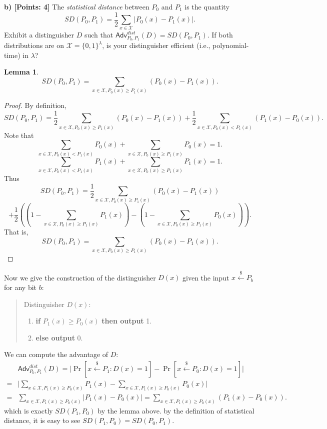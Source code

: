 \documentclass[12pt]{article}
\newcommand{\bits}{\{0,1\}}
\newcommand{\getsr}{\stackrel{\$}{\gets}}
\newcommand{\Adv}{\textsf{Adv}}
\newtheorem{lemma}[theorem]{Lemma}
\theoremstyle{definition}
\begin{document}
{\bf b) [Points: 4]} The \emph{statistical distance} between $P_0$ and $P_1$ is the quantity
$$SD(P_0, P_1) = \frac{1}{2}\sum_{x\in\mathcal{X}}|P_0(x) - P_1(x)|.$$
Exhibit a distinguisher $D$ such that $\Adv_{P_0,P_1}^{dist}(D) = SD(P_0,P_1)$. If both distributions are
on $\mathcal{X} = \bits^\lambda$, is your distinguisher efficient (i.e., polynomial-time) in $\lambda$?
\begin{lemma}
$$SD(P_0, P_1) = \sum_{x\in\mathcal{X}, P_0(x)\geq P_1(x)} (P_0(x) - P_1(x)).$$
\end{lemma} 
\begin{proof}
By definition,
$$SD(P_0, P_1) = \frac{1}{2}\sum_{x\in\mathcal{X}, P_0(x)\geq P_1(x)} (P_0(x) - P_1(x)) + \frac{1}{2}\sum_{x\in\mathcal{X}, P_0(x) < P_1(x)} (P_1(x) - P_0(x)).$$
Note that 
$$\sum_{x\in\mathcal{X}, P_0(x) < P_1(x)} P_0(x) + \sum_{x\in\mathcal{X}, P_0(x) \geq P_1(x)} P_0(x) = 1.$$
$$\sum_{x\in\mathcal{X}, P_0(x) < P_1(x)} P_1(x) + \sum_{x\in\mathcal{X}, P_0(x) \geq P_1(x)} P_1(x) = 1.$$
Thus
$$SD(P_0, P_1) = \frac{1}{2}\sum_{x\in\mathcal{X}, P_0(x)\geq P_1(x)} (P_0(x) - P_1(x))$$
$$ + \frac{1}{2} \left((1-\sum_{x\in\mathcal{X}, P_0(x) \geq P_1(x)} P_1(x))-(1-\sum_{x\in\mathcal{X}, P_0(x) \geq P_1(x)} P_0(x))\right).$$
That is,
$$SD(P_0, P_1) = \sum_{x\in\mathcal{X}, P_0(x)\geq P_1(x)} (P_0(x) - P_1(x)).$$
\end{proof}
Now we give the construction of the distinguisher $D(x)$ given the input $x\getsr P_b$ for any bit $b$:
\begin{quote}
Distinguisher $D(x)$:
\begin{enumerate}
\item {\bf if} $P_1(x) \geq P_0(x)$ {\bf then output} 1.
\item {\bf else output} 0.
\end{enumerate}
\end{quote}
We can compute the advantage of $D$:
$$
\begin{aligned}
& \Adv_{P_0,P_1}^{dist}(D) = \bigg| \Pr[x\getsr P_1: D(x)=1] - \Pr[x\getsr P_0: D(x)=1] \bigg| \\
=& \bigg| \sum_{x\in\mathcal{X}, P_1(x) \geq P_0(x)} P_1(x) - \sum_{x\in\mathcal{X}, P_1(x) \geq P_0(x)} P_0(x) \bigg| \\
=& \sum_{x\in\mathcal{X}, P_1(x) \geq P_0(x)} \bigg| P_1(x) - P_0(x) \bigg| = \sum_{x\in\mathcal{X}, P_1(x) \geq P_0(x)} (P_1(x) - P_0(x)).
\end{aligned}
$$
which is exactly $SD(P_1, P_0)$ by the lemma above. by the definition of statistical distance, it is easy to see $SD(P_1, P_0) = SD(P_0, P_1)$.
\end{document}
